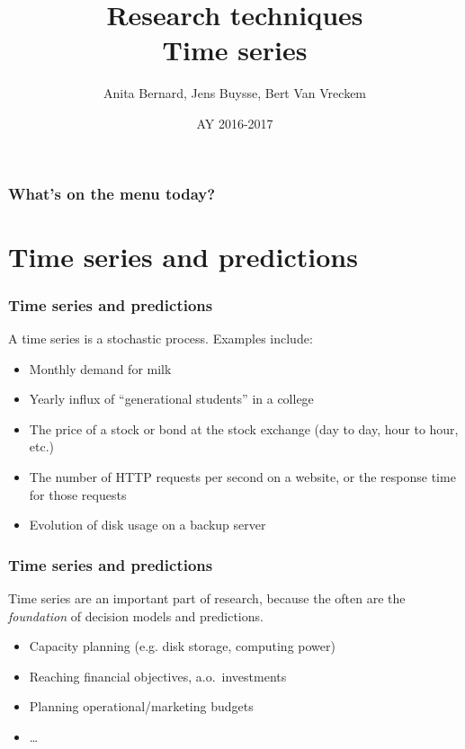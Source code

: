 \documentclass{beamer}
\title[Intro]{Research techniques\\Time series}
\author{Anita Bernard, Jens Buysse, Bert {Van Vreckem}}
\date{AY 2016-2017}
\begin{document}

\HoGentLogo

\titleframe


\begin{frame}
  \frametitle{What's on the menu today?}

  \tableofcontents
\end{frame}

\section{Time series and predictions}

\begin{frame}
  \frametitle{Time series and predictions}


  A time series is a stochastic process. Examples include:

  \begin{itemize}
    \item Monthly demand for milk
    \item Yearly influx of ``generational students'' in a college
    \item The price of a stock or bond at the stock exchange (day to day, hour to hour, etc.)
    \item The number of HTTP requests per second on a website, or the response time for those requests
    \item Evolution of disk usage on a backup server
  \end{itemize}
\end{frame}

\begin{frame}
  \frametitle{Time series and predictions}
  
  Time series are an important part of research, because the often are the \emph{foundation} of decision models and predictions.
  
  \begin{itemize}
    \item Capacity planning (e.g. disk storage, computing power)
    \item Reaching financial objectives, a.o.~investments
    \item Planning operational/marketing budgets
    \item \dots
  \end{itemize}
\end{frame}
\end{document}
